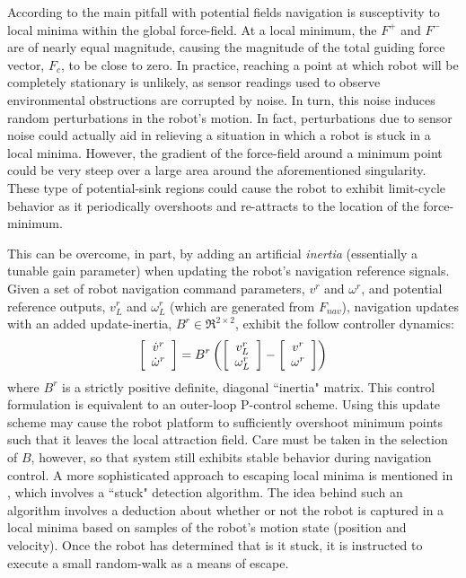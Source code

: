 		According to \cite{Koren1991} the main pitfall with potential fields navigation is susceptivity to local minima within the global force-field. At a local minimum, the $F^{+}$ and $F^{-}$ are of nearly equal magnitude, causing the magnitude of the total guiding force vector, $F_{c}$, to be close to zero. In practice, reaching a point at which robot will be completely stationary is unlikely, as sensor readings used to observe environmental obstructions are corrupted by noise. In turn, this noise induces random perturbations in the robot's motion. In fact, perturbations due to sensor noise could actually aid in relieving a situation in which a robot is stuck in a local minima. However, the gradient of the force-field around a minimum point could be very steep over a large area around the aforementioned singularity. These type of potential-sink regions could cause the robot to exhibit limit-cycle behavior as it periodically overshoots and re-attracts to the location of the force-minimum. 

		This can be overcome, in part, by adding an artificial \emph{inertia} (essentially a tunable gain parameter) when updating the robot's navigation reference signals. Given a set of robot navigation command parameters, $v^{r}$ and $\omega^{r}$, and potential reference outputs, $v^{r}_{L}$ and $\omega^{r}_{L}$ (which are generated from $F_{nav}$), navigation updates with an added update-inertia, $B^{r}\in\Re^{2\times2}$, exhibit the follow controller dynamics:
			\begin{equation}
				\left[
					\begin{array}{c}
						\dot{v}^{r} 		\\
						\dot{\omega}^{r}
					\end{array}
				\right] = 
				B^{r}
				\left(
					\left[
						\begin{array}{c}
							v^{r}_{L} 	\\
							\omega^{r}_{L}
						\end{array}
					\right]
					-
					\left[
						\begin{array}{c}
							v^{r} 	\\
							\omega^{r}
						\end{array}
					\right]
				\right)
			\end{equation}
		where $B^{r}$ is a strictly positive definite, diagonal ``inertia" matrix. This control formulation is equivalent to an outer-loop P-control scheme. Using this update scheme may cause the robot platform to sufficiently overshoot minimum points such that it leaves the local attraction field. Care must be taken in the selection of $B$, however, so that system still exhibits stable behavior during navigation control. A more sophisticated approach to escaping local minima is mentioned in \cite{Krishnamurthy2007}, which involves a ``stuck" detection algorithm. The idea behind such an algorithm involves a deduction about whether or not the robot is captured in a local minima based on samples of the robot’s motion state (\IE position and velocity). Once the robot has determined that is it stuck, it is instructed to execute a small random-walk as a means of escape. 

